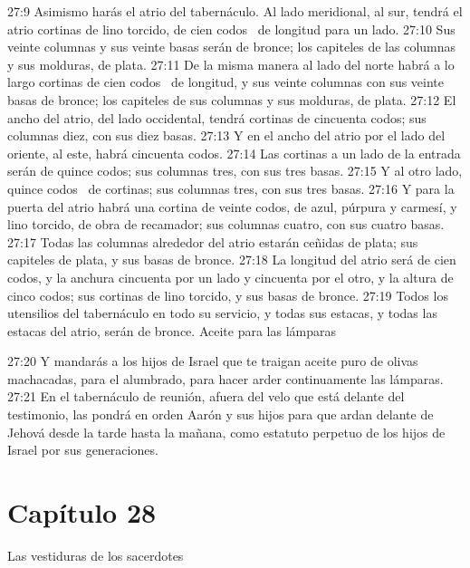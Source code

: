 27:9 Asimismo harás el atrio del tabernáculo. Al lado meridional, al sur, tendrá el atrio cortinas de lino torcido, de cien codos  de longitud para un lado. 
27:10 Sus veinte columnas y sus veinte basas serán de bronce; los capiteles de las columnas y sus molduras, de plata. 
27:11 De la misma manera al lado del norte habrá a lo largo cortinas de cien codos  de longitud, y sus veinte columnas con sus veinte basas de bronce; los capiteles de sus columnas y sus molduras, de plata. 
27:12 El ancho del atrio, del lado occidental, tendrá cortinas de cincuenta codos; sus columnas diez, con sus diez basas. 
27:13 Y en el ancho del atrio por el lado del oriente, al este, habrá cincuenta codos. 
27:14 Las cortinas a un lado de la entrada serán de quince codos; sus columnas tres, con sus tres basas. 
27:15 Y al otro lado, quince codos  de cortinas; sus columnas tres, con sus tres basas. 
27:16 Y para la puerta del atrio habrá una cortina de veinte codos, de azul, púrpura y carmesí, y lino torcido, de obra de recamador; sus columnas cuatro, con sus cuatro basas. 
27:17 Todas las columnas alrededor del atrio estarán ceñidas de plata; sus capiteles de plata, y sus basas de bronce. 
27:18 La longitud del atrio será de cien codos, y la anchura cincuenta por un lado y cincuenta por el otro, y la altura de cinco codos; sus cortinas de lino torcido, y sus basas de bronce. 
27:19 Todos los utensilios del tabernáculo en todo su servicio, y todas sus estacas, y todas las estacas del atrio, serán de bronce. 
Aceite para las lámparas 

27:20 Y mandarás a los hijos de Israel que te traigan aceite puro de olivas machacadas, para el alumbrado, para hacer arder continuamente las lámparas. 
27:21 En el tabernáculo de reunión, afuera del velo que está delante del testimonio, las pondrá en orden Aarón y sus hijos para que ardan delante de Jehová desde la tarde hasta la mañana, como estatuto perpetuo de los hijos de Israel por sus generaciones. 
\section*{Capítulo 28}
Las vestiduras de los sacerdotes 


